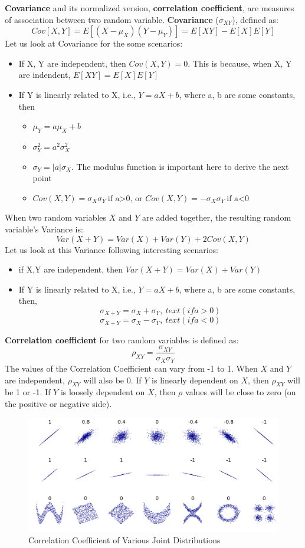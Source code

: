 \textbf{Covariance} and its normalized version, \textbf{correlation coefficient}, are measures of association between two random variable.  \textbf{Covariance} ($\sigma_{XY}$), defined as:
	\[ Cov[X,Y] = E[(X-\mu_X)(Y-\mu_Y)] = E[XY] - E[X]E[Y]\] 
Let us look at Covariance for the some scenarios:
	\begin{itemize}
	\item If X, Y are independent, then \( Cov(X,Y) = 0 \). This is because, when X, Y are indendent, \( E[XY] = E[X]E[Y] \)
	\item If Y is linearly related to X, i.e., \( Y = aX+b \), where a, b are some constants, then 
		\begin{itemize}
		\item \( \mu_Y = a\mu_X + b \)
		\item \( \sigma^2_Y = a^2 \sigma^2_X \)
		\item \( \sigma_Y = |a|\sigma_X \). The modulus function is important here to derive the next point
		\item \( Cov(X,Y) = \sigma_X \sigma_Y\ \text{if a>0, or } Cov(X,Y) = -\sigma_X \sigma_Y\ \text{if a<0} \)
		\end{itemize}
	\end{itemize}

When two random variables $X$ and $Y$ are added together, the resulting random variable's Variance is:
	\[ Var(X+Y) = Var(X) + Var(Y) + 2Cov(X,Y) \]
Let us look at this Variance following interesting scenarios:
	\begin{itemize}
	\item if X,Y are independent, then \( Var(X+Y) = Var(X) + Var(Y) \)
	\item  If Y is linearly related to X, i.e., \( Y = aX+b \), where a, b are some constants, then,
		\[ \sigma_{X+Y} = \sigma_X + \sigma_Y,\ text(if a>0) \]
		\[ \sigma_{X+Y} = \sigma_X - \sigma_Y,\ text(if a<0) \]
	\end{itemize}
	
\textbf{Correlation coefficient} for two random variables is defined as:
	\[ \rho_{XY} = \frac{\sigma_{XY}}{\sigma_X \sigma_Y} \]
The values of the Correlation Coefficient can vary from -1 to 1. When $X$ and $Y$ are independent, $\rho_{XY}$ will also be 0. If $Y$ is linearly dependent on $X$, then $\rho_{XY}$ will be 1 or -1. If $Y$ is loosely dependent on $X$, then $\rho$ values will be close to zero (on the positive or negative side). 
	\begin{figure}
	  \centering
	    \includegraphics[width=\textwidth]{Statistics/correlation}
	  \caption{Correlation Coefficient of Various Joint Distributions}
	  \label{fig:correlation}
	\end{figure}

